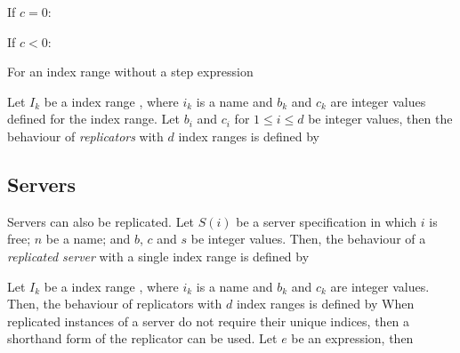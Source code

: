 \documentclass[11pt,a4paper,parskip=half-]{scrartcl}
\begin{document}
\noindent
If $c=0$:

\noindent
If $c<0$:

\noindent
For an index range without a step expression

\noindent
Let $I_k$ be a index range , where $i_k$ is a name
and $b_k$ and $c_k$ are integer values defined for the index range.
%
Let $b_i$ and $c_i$ for $1\leq i \leq d$ be integer values, then
the behaviour of \emph{replicators} with $d$ index ranges is defined by


\subsection{Servers}

Servers can also be replicated.
Let $S(i)$ be a server specification in which $i$ is free; $n$ be a name; and
$b$, $c$ and $s$ be integer values. Then, the behaviour of a \emph{replicated
server} with a single index range is defined by

\noindent
Let $I_k$ be a index range , where $i_k$ is a name
and $b_k$ and $c_k$ are integer values.
%
Then, the behaviour of replicators with $d$ index ranges is defined by
%
When replicated instances of a server do not require their unique indices, then
a shorthand form of the replicator can be used. Let $e$ be an expression, then
%
\end{document}
